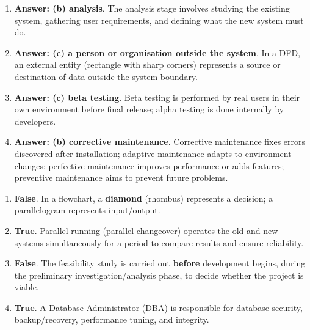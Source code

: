 \documentclass[11pt]{article}
\begin{document}
\begin{corrige}
\begin{enumerate}
\item \textbf{Answer: (b) analysis}. The analysis stage involves studying the existing system, gathering user requirements, and defining what the new system must do.
\item \textbf{Answer: (c) a person or organisation outside the system}. In a DFD, an external entity (rectangle with sharp corners) represents a source or destination of data outside the system boundary.
\item \textbf{Answer: (c) beta testing}. Beta testing is performed by real users in their own environment before final release; alpha testing is done internally by developers.
\item \textbf{Answer: (b) corrective maintenance}. Corrective maintenance fixes errors discovered after installation; adaptive maintenance adapts to environment changes; perfective maintenance improves performance or adds features; preventive maintenance aims to prevent future problems.
\end{enumerate}
\end{corrige}

\begin{corrige}
\begin{enumerate}
\item \textbf{False}. In a flowchart, a \textbf{diamond} (rhombus) represents a decision; a parallelogram represents input/output.
\item \textbf{True}. Parallel running (parallel changeover) operates the old and new systems simultaneously for a period to compare results and ensure reliability.
\item \textbf{False}. The feasibility study is carried out \textbf{before} development begins, during the preliminary investigation/analysis phase, to decide whether the project is viable.
\item \textbf{True}. A Database Administrator (DBA) is responsible for database security, backup/recovery, performance tuning, and integrity.
\end{enumerate}
\end{corrige}
\end{document}
